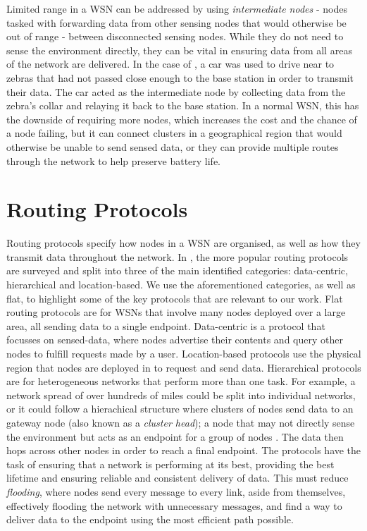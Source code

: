 	Limited range in a WSN can be addressed by using \textit{intermediate nodes} - nodes tasked with forwarding data from other sensing nodes that would otherwise be out of range - between disconnected sensing nodes. While they do not need to sense the environment directly, they can be vital in ensuring data from all areas of the network are delivered. In the case of \cite{Martonosi2003}, a car was used to drive near to zebras that had not passed close enough to the base station in order to transmit their data. The car acted as the intermediate node by collecting data from the zebra's collar and relaying it back to the base station. In a normal WSN, this has the downside of requiring more nodes, which increases the cost and the chance of a node failing, but it can connect clusters in a geographical region that would otherwise be unable to send sensed data, or they can provide multiple routes through the network to help preserve battery life.

\section{Routing Protocols} \label{bg:rp} 
	Routing protocols specify how nodes in a WSN are organised, as well as how they transmit data throughout the network. In \cite{Akkaya2005}, the more popular routing protocols are surveyed and split into three of the main identified categories: data-centric, hierarchical and location-based. We use the aforementioned categories, as well as flat, to highlight some of the key protocols that are relevant to our work. Flat routing protocols are for WSNs that involve many nodes deployed over a large area, all sending data to a single endpoint. Data-centric is a protocol that focusses on sensed-data, where nodes advertise their contents and query other nodes to fulfill requests made by a user. Location-based protocols use the physical region that nodes are deployed in to request and send data. Hierarchical protocols are for heterogeneous networks that perform more than one task. For example, a network spread of over hundreds of miles could be split into individual networks, or it could follow a hierachical structure where clusters of nodes send data to an gateway node  (also known as a \textit{cluster head}); a node that may not directly sense the environment but acts as an endpoint for a group of nodes \cite{Akkaya2005}. The data then hops across other nodes in order to reach a final endpoint.
	The protocols have the task of ensuring that a network is performing at its best, providing the best lifetime and ensuring reliable and consistent delivery of data. This must reduce \textit{flooding}, where nodes send every message to every link, aside from themselves, effectively flooding the network with unnecessary messages, and find a way to deliver data to the endpoint using the most efficient path possible.

